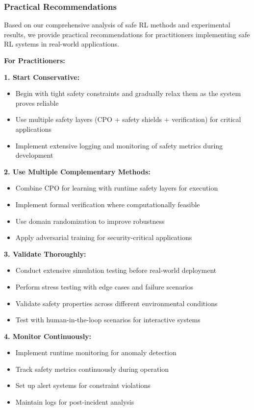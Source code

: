 \documentclass[12pt]{article}
\begin{document}
{{{{\subsubsection{Practical Recommendations}

Based on our comprehensive analysis of safe RL methods and experimental results, we provide practical recommendations for practitioners implementing safe RL systems in real-world applications.

\textbf{For Practitioners:}

\textbf{1. Start Conservative:}
\begin{itemize}
\item Begin with tight safety constraints and gradually relax them as the system proves reliable
\item Use multiple safety layers (CPO + safety shields + verification) for critical applications
\item Implement extensive logging and monitoring of safety metrics during development
\end{itemize}

\textbf{2. Use Multiple Complementary Methods:}
\begin{itemize}
\item Combine CPO for learning with runtime safety layers for execution
\item Implement formal verification where computationally feasible
\item Use domain randomization to improve robustness
\item Apply adversarial training for security-critical applications
\end{itemize}

\textbf{3. Validate Thoroughly:}
\begin{itemize}
\item Conduct extensive simulation testing before real-world deployment
\item Perform stress testing with edge cases and failure scenarios
\item Validate safety properties across different environmental conditions
\item Test with human-in-the-loop scenarios for interactive systems
\end{itemize}

\textbf{4. Monitor Continuously:}
\begin{itemize}
\item Implement runtime monitoring for anomaly detection
\item Track safety metrics continuously during operation
\item Set up alert systems for constraint violations
\item Maintain logs for post-incident analysis
\end{itemize}

}}}}
\end{document}
